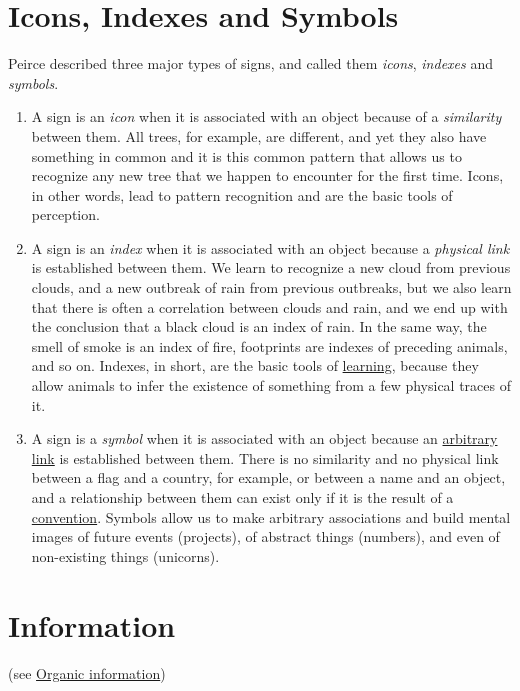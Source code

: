 \documentclass[12pt]{article}
\begin{document}
\hypertarget{icons_indexes_and_symbols}{}
\section{Icons, Indexes and Symbols}
Peirce described three major types of signs, and called them \textit{icons}, \textit{indexes} and \textit{symbols}.
\begin{enumerate}
\item A sign is an \textit{icon} when it is associated with an object because of a \textit{similarity} between them. All trees, for example, are different, and yet they also have something in common and it is this common pattern that allows us to recognize any new tree that we happen to encounter for the first time. Icons, in other words, lead to pattern recognition and are the basic tools of perception. 

\item A sign is an \textit{index} when it is associated with an object because a \textit{physical link} is established between them. We learn to recognize a new cloud from previous clouds, and a new outbreak of rain from previous outbreaks, but we also learn that there is often a correlation between clouds and rain, and we end up with the conclusion that a black cloud is an index of rain. In the same way, the smell of smoke is an index of fire, footprints are indexes of preceding animals, and so on. Indexes, in short, are the basic tools of \hyperlink{learning}{learning}, because they allow animals to infer the existence of something from a few physical traces of it.

\item A sign is a \textit{symbol} when it is associated with an object because an \hyperlink{arbitrariness}{arbitrary link} is established between them. There is no similarity and no physical link between a flag and a country, for example, or between a name and an object, and a relationship between them can exist only if it is the result of a \hyperlink{convention}{convention}. Symbols allow us to make arbitrary associations and build mental images of future events (projects), of abstract things (numbers), and even of non-existing things (unicorns). 
\end{enumerate}


\hypertarget{information}{}
\section{Information} (see \hyperlink{organic_information}{Organic information}) 
\end{document}
